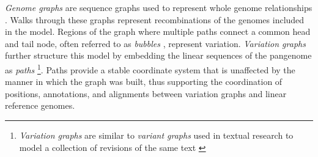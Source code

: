 \emph{Genome graphs} are sequence graphs used to represent whole genome relationships \cite{Paten_2017}.
Walks through these graphs represent recombinations of the genomes included in the model.
Regions of the graph where multiple paths connect a common head and tail node, often referred to as \emph{bubbles} \cite{paten2018superbubbles}, represent variation.
\emph{Variation graphs} further structure this model by embedding the linear sequences of the pangenome as \emph{paths} \cite{Garrison_2018}\footnote{\emph{Variation graphs} are similar to \emph{variant graphs} used in textual research to model a collection of revisions of the same text \cite{schmidt2009data}}.
Paths provide a stable coordinate system that is unaffected by the manner in which the graph was built, thus supporting the coordination of positions, annotations, and alignments between variation graphs and linear reference genomes.










